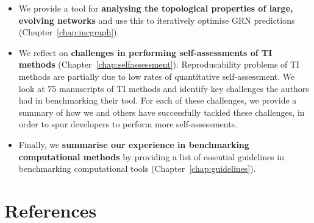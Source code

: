 \begin{itemize}
	\item We provide a tool for \textbf{analysing the topological properties of large, evolving networks} and use this to iteratively optimise GRN predictions (Chapter~\ref{chap:incgraph}).
	\item We reflect on \textbf{challenges in performing self-assessments of TI methods} (Chapter~\ref{chap:selfassessment}).
	Reproducability problems of TI methods are partially due to low rates of quantitative self-assessment. We look at 75 manuscripts of TI methods and identify key challenges the authors had in benchmarking their tool. For each of these challenges, we provide a summary of how we and others have successfully tackled these challenges, in order to spur developers to perform more self-assessments.
	\item Finally, we \textbf{summarise our experience in benchmarking computational methods} by providing a list of essential guidelines in benchmarking computational tools (Chapter~\ref{chap:guidelines}).
\end{itemize}


\clearpage
\section{References}
\printbibliography[heading=none]